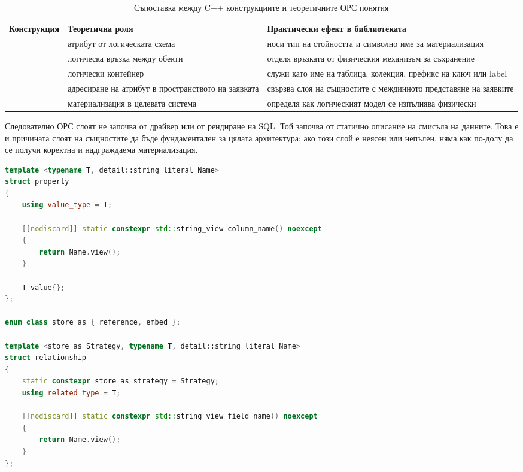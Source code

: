 \begin{table}[H]
\centering
\small
\caption{Съпоставка между C++ конструкциите и теоретичните ОРС понятия}
\label{tab:cpp_to_orm_concepts}
\begin{tabularx}{\textwidth}{L{3.3cm}L{4.0cm}Y}
\toprule
\textbf{Конструкция} & \textbf{Теоретична роля} & \textbf{Практически ефект в библиотеката} \\
\midrule
{} & атрибут от логическата схема & носи тип на стойността и символно име за материализация \\
 & логическа връзка между обекти & отделя връзката от физическия механизъм за съхранение \\
 & логически контейнер & служи като име на таблица, колекция, префикс на ключ или label \\
 & адресиране на атрибут в пространството на заявката & свързва слоя на същностите с междинното представяне на заявките \\
 & материализация в целевата система & определя как логическият модел се изпълнява физически \\
\bottomrule
\end{tabularx}
\end{table}

Следователно ОРС слоят не започва от драйвер или от рендиране на SQL. Той започва от статично описание на смисъла на данните. Това е и причината слоят на същностите да бъде фундаментален за цялата архитектура: ако този слой е неясен или непълен, няма как по-долу да се получи коректна и надграждаема материализация.

\begin{lstlisting}[language=C++,caption={Извадка от \code{property} и \code{relationship} в слоя на същностите},label={lst:property_relationship}]
template <typename T, detail::string_literal Name>
struct property
{
    using value_type = T;

    [[nodiscard]] static constexpr std::string_view column_name() noexcept
    {
        return Name.view();
    }

    T value{};
};

enum class store_as { reference, embed };

template <store_as Strategy, typename T, detail::string_literal Name>
struct relationship
{
    static constexpr store_as strategy = Strategy;
    using related_type = T;

    [[nodiscard]] static constexpr std::string_view field_name() noexcept
    {
        return Name.view();
    }
};
\end{lstlisting}

